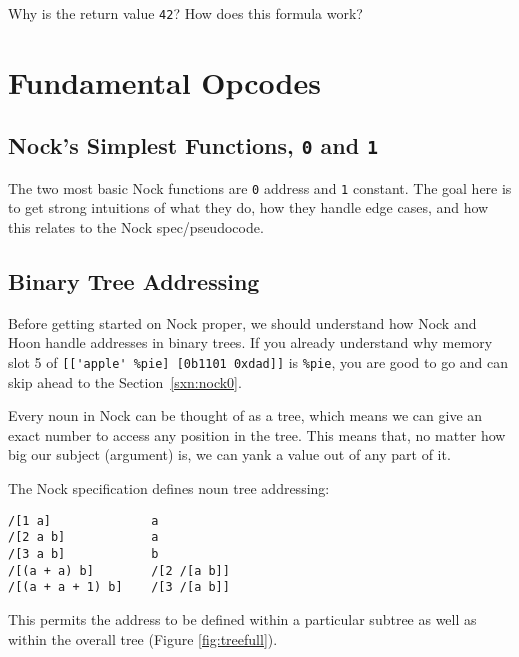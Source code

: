 \documentclass[twoside]{article}
\begin{document}
Why is the return value \lstinline[style=inlinecode]{42}? How does this formula work?

\section{Fundamental Opcodes}

\subsection{Nock's Simplest Functions, \lstinline[style=inlinecode]{0} and \lstinline[style=inlinecode]{1}}

The two most basic Nock functions are \lstinline[style=inlinecode]{0} address and \lstinline[style=inlinecode]{1} constant. The goal here is to get strong intuitions of what they do, how they handle edge cases, and how this relates to the Nock spec/pseudocode.

\subsection{Binary Tree Addressing}

Before getting started on Nock proper, we should understand how Nock and Hoon handle addresses in binary trees.  If you already understand why memory slot 5 of \lstinline[style=inlinecode]{[['apple' %pie] [0b1101 0xdad]]} is \lstinline[style=inlinecode]{%pie}, you are good to go and can skip ahead to the Section~\ref{sxn:nock0}.

Every noun in Nock can be thought of as a tree, which means we can give an exact number to access any position in the tree. This means that, no matter how big our subject (argument) is, we can yank a value out of any part of it.

The Nock specification defines noun tree addressing:

\begin{lstlisting}[style=listingcode]
/[1 a]              a
/[2 a b]            a
/[3 a b]            b
/[(a + a) b]        /[2 /[a b]]
/[(a + a + 1) b]    /[3 /[a b]]
\end{lstlisting}

\noindent
This permits the address to be defined within a particular subtree as well as within the overall tree (Figure \ref{fig:treefull}).
\end{document}
